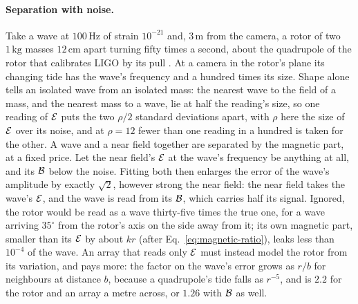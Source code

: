 \paragraph{Separation with noise.} Take a wave at $100\,\mathrm{Hz}$ of strain
$10^{-21}$ and, $3\,\mathrm{m}$ from the camera, a rotor of two
$1\,\mathrm{kg}$ masses $12\,\mathrm{cm}$ apart turning fifty times a second,
about the quadrupole of the rotor that calibrates LIGO by its pull
\cite{Ross2021}. At a camera in the rotor's plane its changing tide has the wave's frequency and a hundred times
its size. Shape alone tells an isolated wave from an isolated mass: the nearest
wave to the field of a mass, and the nearest mass to a wave, lie at half the
reading's size, so one reading of $\mathcal{E}$ puts the two $\rho/2$ standard
deviations apart, with $\rho$ here the size of $\mathcal{E}$ over its noise, and at $\rho = 12$ fewer than one reading in a hundred is
taken for the other. A wave and a near field together are separated by the
magnetic part, at a fixed price. Let the near field's $\mathcal{E}$ at the wave's
frequency be anything at all, and its $\mathcal{B}$ below the noise. Fitting both then
enlarges the error of the wave's amplitude by exactly $\sqrt2$, however strong
the near field: the near field takes the wave's $\mathcal{E}$, and the wave is read from
its $\mathcal{B}$, which carries half its signal. Ignored, the rotor would be read as a
wave thirty-five times the true one, for a wave arriving $35^\circ$ from the
rotor's axis on the side away from it; its own magnetic part, smaller than its $\mathcal{E}$ by
about $kr$ (after Eq.~\eqref{eq:magnetic-ratio}), leaks less than $10^{-4}$ of the
wave. An array that reads only $\mathcal{E}$ must instead model the rotor from its
variation, and pays more: the factor on the wave's error grows as $r/b$ for
neighbours at distance $b$, because a quadrupole's tide falls as $r^{-5}$, and
is $2.2$ for the rotor and an array a metre across, or $1.26$ with $\mathcal{B}$ as well.

